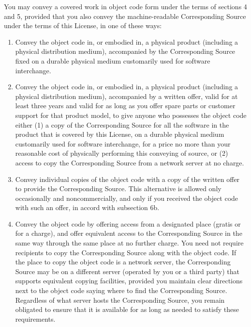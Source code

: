 \documentclass{article}%
\begin{document}
\begin{enumerate}
You may convey a covered work in object code form under the terms
of sections 4 and 5, provided that you also convey the
machine-readable Corresponding Source under the terms of this License,
in one of these ways:
        \begin{enumerate}
        \item Convey the object code in, or embodied in, a physical product
        (including a physical distribution medium), accompanied by the
        Corresponding Source fixed on a durable physical medium
        customarily used for software interchange.

        \item Convey the object code in, or embodied in, a physical product
        (including a physical distribution medium), accompanied by a
        written offer, valid for at least three years and valid for as
        long as you offer spare parts or customer support for that product
        model, to give anyone who possesses the object code either (1) a
        copy of the Corresponding Source for all the software in the
        product that is covered by this License, on a durable physical
        medium customarily used for software interchange, for a price no
        more than your reasonable cost of physically performing this
        conveying of source, or (2) access to copy the
        Corresponding Source from a network server at no charge.

        \item Convey individual copies of the object code with a copy of the
        written offer to provide the Corresponding Source.      This
        alternative is allowed only occasionally and noncommercially, and
        only if you received the object code with such an offer, in accord
        with subsection 6b.

        \item Convey the object code by offering access from a designated
        place (gratis or for a charge), and offer equivalent access to the
        Corresponding Source in the same way through the same place at no
        further charge.  You need not require recipients to copy the
        Corresponding Source along with the object code.        If the place to
        copy the object code is a network server, the Corresponding Source
        may be on a different server (operated by you or a third party)
        that supports equivalent copying facilities, provided you maintain
        clear directions next to the object code saying where to find the
        Corresponding Source.    Regardless of what server hosts the
        Corresponding Source, you remain obligated to ensure that it is
        available for as long as needed to satisfy these requirements.


\end{enumerate}
\end{enumerate}
\end{document}
